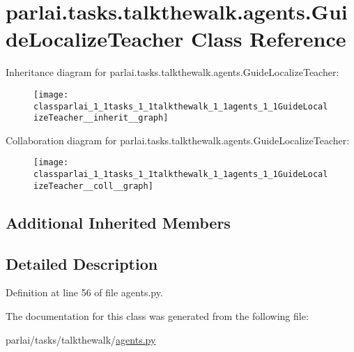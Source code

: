 \hypertarget{classparlai_1_1tasks_1_1talkthewalk_1_1agents_1_1GuideLocalizeTeacher}{}\section{parlai.\+tasks.\+talkthewalk.\+agents.\+Guide\+Localize\+Teacher Class Reference}
\label{classparlai_1_1tasks_1_1talkthewalk_1_1agents_1_1GuideLocalizeTeacher}


Inheritance diagram for parlai.\+tasks.\+talkthewalk.\+agents.\+Guide\+Localize\+Teacher\+:
\nopagebreak
\begin{figure}[H]
\begin{center}
\leavevmode
\texttt{[image: classparlai\_1\_1tasks\_1\_1talkthewalk\_1\_1agents\_1\_1GuideLocalizeTeacher\_\_inherit\_\_graph]}
\end{center}
\end{figure}


Collaboration diagram for parlai.\+tasks.\+talkthewalk.\+agents.\+Guide\+Localize\+Teacher\+:
\nopagebreak
\begin{figure}[H]
\begin{center}
\leavevmode
\texttt{[image: classparlai\_1\_1tasks\_1\_1talkthewalk\_1\_1agents\_1\_1GuideLocalizeTeacher\_\_coll\_\_graph]}
\end{center}
\end{figure}
\subsection*{Additional Inherited Members}


\subsection{Detailed Description}


Definition at line 56 of file agents.\+py.



The documentation for this class was generated from the following file\+:\begin{DoxyCompactItemize}
\item 
parlai/tasks/talkthewalk/\hyperlink{parlai_2tasks_2talkthewalk_2agents_8py}{agents.\+py}\end{DoxyCompactItemize}
